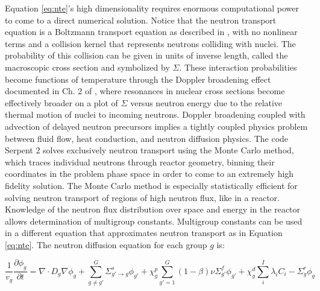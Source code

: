 Equation \ref{eq:nte}'s high dimensionality requires enormous computational power to come to a direct numerical solution. Notice that the neutron transport equation is a Boltzmann transport equation as described in \cite{boltzmann_lectures_2011}, with no nonlinear terms and a collision kernel that represents neutrons colliding with nuclei. The probability of this collision can be given in units of inverse length, called the macroscopic cross section and symbolized by $\Sigma$. These interaction probabilities become functions of temperature through the Doppler broadening effect documented in Ch. 2 of \cite{duderstadt_nuclear_1976}, where resonances in nuclear cross sections become effectively broader on a plot of $\Sigma$ versus neutron energy due to the relative thermal motion of nuclei to incoming neutrons. Doppler broadening coupled with advection of delayed neutron precursors implies a tightly coupled physics problem between fluid flow, heat conduction, and neutron diffusion physics. The code Serpent 2 solves exclusively neutron transport using the Monte Carlo method, which traces individual neutrons through reactor geometry, binning their coordinates in the problem phase space in order to come to an extremely high fidelity solution. The Monte Carlo method is especially statistically efficient for solving neutron transport of regions of high neutron flux, like in a reactor. Knowledge of the neutron flux distribution over space and energy in the reactor allows determination of multigroup constants. Multigroup constants can be used in a different equation that approximates neutron transport as in Equation \ref{eq:nte}. The neutron diffusion equation for each group $g$ is:

\begin{equation}                \frac{1}{v_g}\frac{\partial {\phi}_g}{\partial t}   = \nabla \cdot D_g
                \nabla {\phi}_g +
                \sum_{g \ne g'}^G
                {\Sigma_{g'\rightarrow g}^s} {\phi}_{g'} + \chi_g^p \sum_{g' = 1}^G (1 -
                \beta) \nu {\Sigma_{g'}^f} {\phi}_{g'} + \chi_g^d \sum_i^I 
                \lambda_i {C_i} - {\Sigma_g^r} {\phi_g}
\label{eq:diff}
\end{equation}

